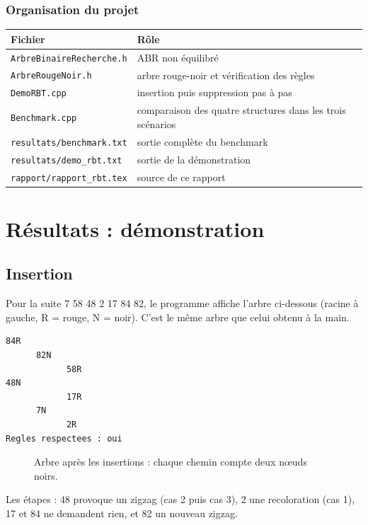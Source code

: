 \documentclass[12pt,a4paper]{report}
\begin{document}
\subsection{Organisation du projet}
\begin{center}
\small
\begin{tabular}{ll}
  \toprule
  Fichier & Rôle \\
  \midrule
  \texttt{ArbreBinaireRecherche.h} & ABR non équilibré \\
  \texttt{ArbreRougeNoir.h} & arbre rouge-noir et vérification des règles \\
  \texttt{DemoRBT.cpp} & insertion puis suppression pas à pas \\
  \texttt{Benchmark.cpp} & comparaison des quatre structures dans les trois scénarios \\
  \texttt{resultats/benchmark.txt} & sortie complète du benchmark \\
  \texttt{resultats/demo\_rbt.txt} & sortie de la démonstration \\
  \texttt{rapport/rapport\_rbt.tex} & source de ce rapport \\
  \bottomrule
\end{tabular}
\end{center}

\chapter{Résultats : démonstration}

\section{Insertion}
Pour la suite 7 58 48 2 17 84 82, le programme affiche l'arbre ci-dessous (racine à gauche, R = rouge, N = noir). C'est le même arbre que celui obtenu à la main.
\begin{lstlisting}[style=sortie]
            84R
      82N
            58R
48N
            17R
      7N
            2R
Regles respectees : oui
\end{lstlisting}

\begin{figure}[H]
\centering
{}
\caption{Arbre après les insertions : chaque chemin compte deux nœuds noirs.}
\end{figure}
Les étapes : 48 provoque un zigzag (cas 2 puis cas 3), 2 une recoloration (cas 1), 17 et 84 ne demandent rien, et 82 un nouveau zigzag.
\end{document}
